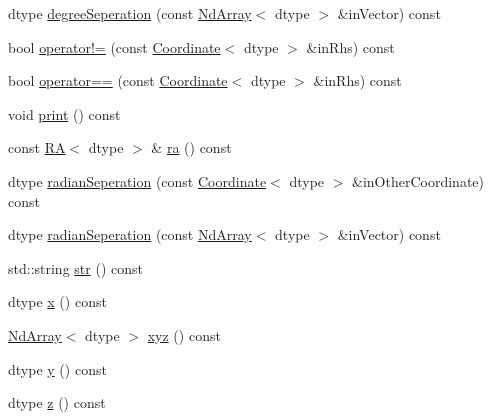 \begin{DoxyCompactItemize}
\item 
dtype \mbox{\hyperlink{class_num_cpp_1_1_coordinates_1_1_coordinate_a3e9c20dfa5ec3045f746344542c06e81}{degree\+Seperation}} (const \mbox{\hyperlink{class_num_cpp_1_1_nd_array}{Nd\+Array}}$<$ dtype $>$ \&in\+Vector) const
\item 
bool \mbox{\hyperlink{class_num_cpp_1_1_coordinates_1_1_coordinate_a0dcc2f1285e939100e6e55d3fa6b1a61}{operator!=}} (const \mbox{\hyperlink{class_num_cpp_1_1_coordinates_1_1_coordinate}{Coordinate}}$<$ dtype $>$ \&in\+Rhs) const
\item 
bool \mbox{\hyperlink{class_num_cpp_1_1_coordinates_1_1_coordinate_ab45610b5c1480afe554ee58bc86990af}{operator==}} (const \mbox{\hyperlink{class_num_cpp_1_1_coordinates_1_1_coordinate}{Coordinate}}$<$ dtype $>$ \&in\+Rhs) const
\item 
void \mbox{\hyperlink{class_num_cpp_1_1_coordinates_1_1_coordinate_a01e9d9db5cdb57678f4aede1939214cf}{print}} () const
\item 
const \mbox{\hyperlink{class_num_cpp_1_1_coordinates_1_1_r_a}{RA}}$<$ dtype $>$ \& \mbox{\hyperlink{class_num_cpp_1_1_coordinates_1_1_coordinate_a87ab8065c93fc089e95b43510e3fab94}{ra}} () const
\item 
dtype \mbox{\hyperlink{class_num_cpp_1_1_coordinates_1_1_coordinate_a8f875954a12c27848e494507bfda4b22}{radian\+Seperation}} (const \mbox{\hyperlink{class_num_cpp_1_1_coordinates_1_1_coordinate}{Coordinate}}$<$ dtype $>$ \&in\+Other\+Coordinate) const
\item 
dtype \mbox{\hyperlink{class_num_cpp_1_1_coordinates_1_1_coordinate_ac23fb1e36d5b3b090dd1188dd4ce174c}{radian\+Seperation}} (const \mbox{\hyperlink{class_num_cpp_1_1_nd_array}{Nd\+Array}}$<$ dtype $>$ \&in\+Vector) const
\item 
std\+::string \mbox{\hyperlink{class_num_cpp_1_1_coordinates_1_1_coordinate_a415be42fdb49cb3e573a9492a15c88e0}{str}} () const
\item 
dtype \mbox{\hyperlink{class_num_cpp_1_1_coordinates_1_1_coordinate_a6f50cd856484c4a08e376970c58820b4}{x}} () const
\item 
\mbox{\hyperlink{class_num_cpp_1_1_nd_array}{Nd\+Array}}$<$ dtype $>$ \mbox{\hyperlink{class_num_cpp_1_1_coordinates_1_1_coordinate_a17960f2fcadf941cbfaa8c38aa26c07d}{xyz}} () const
\item 
dtype \mbox{\hyperlink{class_num_cpp_1_1_coordinates_1_1_coordinate_a913147d914b6435aee56a266e0148cbe}{y}} () const
\item 
dtype \mbox{\hyperlink{class_num_cpp_1_1_coordinates_1_1_coordinate_a1ae1746da7602f619eef958552ffd743}{z}} () const
\end{DoxyCompactItemize}
